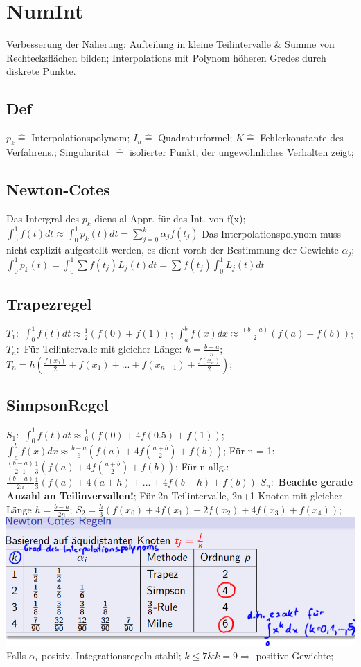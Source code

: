 \section{NumInt}
Verbesserung der Näherung: Aufteilung in kleine Teilintervalle \& Summe von Rechtecksflächen bilden; Interpolations mit Polynom höheren Gredes durch diskrete Punkte.
\subsection{Def}
$ p_{k} \hat{=} $ Interpolationspolynom; 
$ I_{n} \hat{=} $ Quadraturformel; 
$ K \hat{=} $ Fehlerkonstante des Verfahrens.; 
Singularität $\hat{=}$ isolierter Punkt, der ungewöhnliches Verhalten zeigt; 

\subsection{Newton-Cotes}
Das Intergral des $ p_{k} $ diens al Appr. für das Int. von f(x); 
$ \int_{0}^{1} f(t) dt \approx \int_{0}^{1} p_{k} (t) dt =  \sum_{j=0}^{k} \alpha_j f( t_{j} ) $ Das Interpolationspolynom muss nicht explizit aufgestellt werden, es dient vorab der Bestimmung der Gewichte $ \alpha_{j} $; 
$ \int_{0}^{1} p_{k}(t) = \int_{0}^{1} \sum f( t_{j} ) L_{j} (t) dt = \sum f ( t_{j} ) \int_{0}^{1} L_{j} (t) dt $
\subsection{Trapezregel}
$ T_{1}: $ 
$ \int_{0}^{1} f (t) dt \approx \frac{1}{2} ( f(0) + f(1) ) $; 
$ \int_{a}^{b} f (x) dx \approx \frac{(b-a)}{2} (f(a) + f(b) ) $;\\
$ T_{n}: $
Für Teilintervalle mit gleicher Länge: $ h = \frac{b-a}{n} $;  
$ T_{n} = h (\frac{ f ( x_{0} ) }{2} + f(x_{1}) + ... + f(x_{n-1}) + \frac{ f(x_n) }{2} ) $; 
\subsection{SimpsonRegel}
$ S_{1}: $ 
$ \int_{0}^{1} f (t) dt \approx \frac{1}{6} ( f(0) + 4f(0.5) + f(1) ) $; 
$\int_{a}^{b} f (x) dx \approx \frac{b-a}{6} ( f(a) + 4f( \frac{a+b}{2}) + f(b) ) $; 
Für n = 1: $\frac{( b-a )}{2\cdot1} \frac{1}{3} ( f(a) + 4f( \frac{a+b}{2}) + f(b) ) $; 
Für n allg.: $ \frac{( b-a) }{2n}\frac{1}{3} ( f(a) + 4(a+h) + ... + 4f(b-h)+ f(b) ) $ 
$ S_{n}:$ 
\textbf{Beachte gerade Anzahl an Teilinvervallen!}; 
Für 2n Teilintervalle, 2n+1 Knoten mit gleicher Länge $ h = \frac{ b-a }{2n} $; 
$ S_{2} = \frac{h}{3} ( f(x_{0}) + 4f(x_{1}) + 2f(x_{2}) + 4f(x_{3}) + f(x_{4}) ) $; 
\includegraphics[scale=0.25]{./pic/NewtonCodesRegeln.png}
Falls $\alpha_{i} $ positiv. Integrationsregeln stabil; 
$ k \le 7 \& k =9 \Rightarrow $ positive Gewichte;
